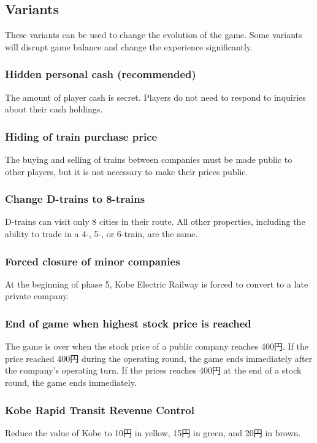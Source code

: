 \documentclass{article}
\begin{document}
\begin{CJK}{UTF8}{min}
\begin{multicols}{2}
\subsection{Variants}
These variants can be used to change the evolution of the game. Some
variants will disrupt game balance and change the experience
significantly.

\subsubsection{Hidden personal cash (recommended)}
The amount of player cash is secret. Players do not need to respond to
inquiries about their cash holdings.

\subsubsection{Hiding of train purchase price}
The buying and selling of trains between companies must be made public
to other players, but it is not necessary to make their prices public.

\subsubsection{Change D-trains to 8-trains}
D-trains can visit only 8 cities in their route. All other properties,
including the ability to trade in a 4-, 5-, or 6-train, are the same.

\subsubsection{Forced closure of minor companies}
At the beginning of phase 5, Kobe Electric Railway is forced to
convert to a late private company.

\subsubsection{End of game when highest stock price is reached}
The game is over when the stock price of a public company reaches 400円.
If the price reached 400円 during the operating round, the game ends
immediately after the company's operating turn. If the prices reaches
400円 at the end of a stock round, the game ends immediately.

\subsubsection{Kobe Rapid Transit Revenue Control}
Reduce the value of Kobe to 10円 in yellow, 15円 in green, and 20円 in brown.


\end{multicols}
\end{CJK}
\end{document}
